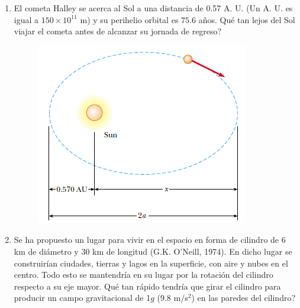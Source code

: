 \documentclass[11pt,twocolumn]{article}
\begin{document}
\begin{enumerate}
\item El cometa Halley se acerca al Sol a una distancia de 0.57 A. U. (Un A. U. es igual a $150 \times 10^{11}$ m) y su perihelio orbital es $75.6$ años. Qué tan lejos del Sol viajar el cometa antes de alcanzar su jornada de regreso?
\begin{figure}[h]
\centering
\includegraphics[scale=0.55]{fig2}
\end{figure}

\item Se ha propuesto un lugar para vivir en el espacio en forma de cilindro de $6$ km de diámetro y $30$ km de longitud (G.K. O'Neill, 1974). En dicho lugar se construirían ciudades, tierras y lagos en la superficie, con aire y nubes en el centro. Todo esto se mantendría en su lugar por la rotación del cilindro respecto a su eje mayor. Qué tan rápido tendría que girar el cilindro para producir un campo gravitacional de 1$g$ (9.8 m$/$s$^{2}$) en las paredes del cilindro?



\end{enumerate}
\end{document}

